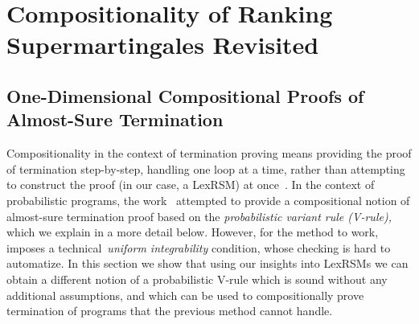 \section{Compositionality of Ranking Supermartingales Revisited}
\label{sec:compositional}

\subsection{One-Dimensional Compositional Proofs of Almost-Sure Termination}

Compositionality in the context of termination proving means providing the 
proof of termination step-by-step, handling one loop at a time, rather than 
attempting to construct the proof (in our case, a LexRSM) at 
once~\cite{KSTW10:compositional-transition-invariants}. 
In the context of 
probabilistic programs, the work~\cite{HolgerPOPL} attempted to provide a 
compositional notion of almost-sure termination proof based on the 
\emph{probabilistic variant rule (V-rule),} which we explain in a more detail 
below. However, for the method to work,~\cite{HolgerPOPL} imposes a 
technical~\emph{uniform integrability} condition, whose checking is hard to 
automatize. In this 
section we show that using our insights into LexRSMs we 
can obtain a different notion of a probabilistic V-rule which is sound 
without any additional assumptions, and which can be used to compositionally 
prove termination 
of programs that the previous method cannot handle. 


